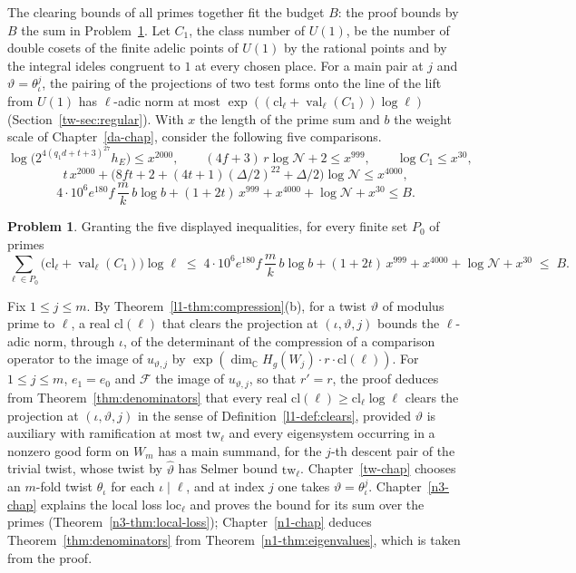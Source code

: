 \documentclass[reqno]{amsart}
\newcounter{chap}
\theoremstyle{definition}
\newtheorem{problem}{Problem}[section]
\theoremstyle{plain}
\newcommand{\C}{\mathbb{C}}
\newcommand{\val}{\operatorname{val}}
\newcommand{\cl}{\mathrm{cl}}
\newcommand{\loc}{\mathrm{loc}}
\begin{document}
The clearing bounds of all primes together fit the budget \(B\): the proof bounds by \(B\) the sum in Problem~\ref{pr:budget-sum}.  Let \(C_1\), the class number of \(U(1)\), be the number of double cosets of the finite adelic points of \(U(1)\) by the rational points and by the integral ideles congruent to \(1\) at every chosen place.  For a main pair at \(j\) and \(\vartheta=\theta_\iota^j\), the pairing of the projections of two test forms onto the line of the lift from \(U(1)\) has \(\ell\)-adic norm at most \(\exp((\cl_\ell+\val_\ell(C_1))\log\ell)\) (Section~\ref{tw-sec:regular}).  With \(x\) the length of the prime sum and \(b\) the weight scale of Chapter~\ref{da-chap}, consider the following five comparisons.
\[
  \log\bigl(2^{4(q_1d + t + 3)^{27}} h_E\bigr) \le x^{2000}, \qquad (4f+3)\,r\log\mathcal N + 2 \le x^{999}, \qquad \log C_1 \le x^{30},
\]
\[
  t\,x^{2000} + \bigl(8ft + 2 + (4t + 1)(\Delta/2)^{22} + \Delta/2\bigr)\log\mathcal N \le x^{4000},
\]
\[
  4\cdot 10^6 e^{180} f\,\frac mk\, b\log b + (1 + 2t)\,x^{999} + x^{4000} + \log\mathcal N + x^{30} \le B .
\]

\begin{problem}\label{pr:budget-sum}
Granting the five displayed inequalities, for every finite set \(P_0\) of primes
\[
  \sum_{\ell \in P_0} \bigl(\cl_\ell + \val_\ell(C_1)\bigr)\log\ell \;\le\; 4\cdot 10^6 e^{180} f\,\frac mk\, b\log b + (1 + 2t)\,x^{999} + x^{4000} + \log\mathcal N + x^{30} \;\le\; B .
\]
\end{problem}

Fix \(1\le j\le m\).  By Theorem~\ref{l1-thm:compression}(b), for a twist \(\vartheta\) of modulus prime to \(\ell\), a real \(\cl(\ell)\) that clears the projection at \((\iota,\vartheta,j)\) bounds the \(\ell\)-adic norm, through \(\iota\), of the determinant of the compression of a comparison operator to the image of \(u_{\vartheta,j}\) by \(\exp(\dim_{\C} H_g(W_j)\cdot r\cdot\cl(\ell))\).  For \(1 \le j \le m\), \(e_1 = e_0\) and \(\mathcal F\) the image of \(u_{\vartheta,j}\), so that \(r' = r\), the proof deduces from Theorem~\ref{thm:denominators} that every real \(\cl(\ell) \ge \cl_\ell\log\ell\) clears the projection at \((\iota, \vartheta, j)\) in the sense of Definition~\ref{l1-def:clears}, provided \(\vartheta\) is auxiliary with ramification at most \(\mathrm{tw}_\ell\) and every eigensystem occurring in a nonzero good form on \(W_m\) has a main summand, for the \(j\)-th descent pair of the trivial twist, whose twist by \(\hat\vartheta\) has Selmer bound \(\mathrm{tw}_\ell\).  Chapter~\ref{tw-chap} chooses an \(m\)-fold twist \(\theta_\iota\) for each \(\iota \mid \ell\), and at index \(j\) one takes \(\vartheta = \theta_\iota^j\).  Chapter~\ref{n3-chap} explains the local loss \(\loc_\ell\) and proves the bound for its sum over the primes (Theorem~\ref{n3-thm:local-loss}); Chapter~\ref{n1-chap} deduces Theorem~\ref{thm:denominators} from Theorem~\ref{n1-thm:eigenvalues}, which is taken from the proof.
\end{document}
